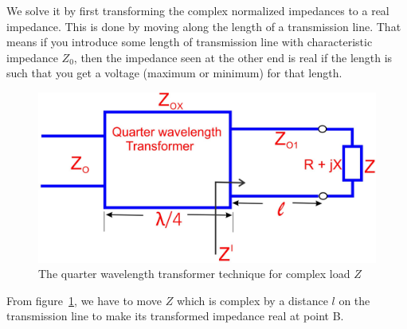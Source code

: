 We solve it by first transforming the complex normalized impedances to a real impedance. This is done by moving along the length of a transmission line. That means if you introduce some length of transmission line with characteristic impedance $ Z_0$, then the impedance seen at the other end is real if the length is such that you get a voltage (maximum or minimum) for that length.
\begin{figure}[h]
\centering
\includegraphics[width=1\linewidth]{./graphics/fig10}
\caption{The quarter wavelength transformer technique for complex load $Z$}
\label{fig:fig10}
\end{figure}

From figure~\ref{fig:fig10}, we have to move $Z$ which is complex by a distance $l$ on the transmission line to make its transformed impedance real at point B.

